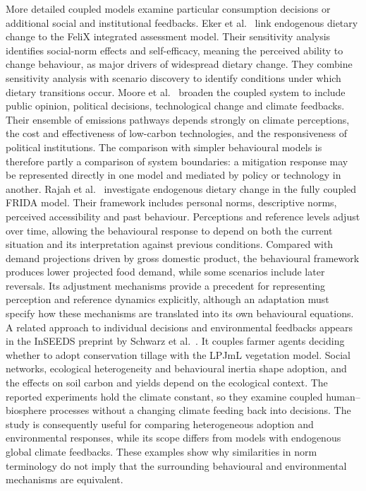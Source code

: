 More detailed coupled models examine particular consumption decisions or additional social and
institutional feedbacks. Eker et al.~\cite{eker2019diets} link endogenous dietary change to the FeliX
integrated assessment model. Their sensitivity analysis identifies social-norm effects and self-efficacy,
meaning the perceived ability to change behaviour, as major drivers of widespread dietary change. They
combine sensitivity analysis with scenario discovery to identify conditions under which dietary
transitions occur. Moore et al.~\cite{moore2022pathways} broaden the coupled system to include public
opinion, political decisions, technological change and climate feedbacks. Their ensemble of emissions
pathways depends strongly on climate perceptions, the cost and effectiveness of low-carbon technologies,
and the responsiveness of political institutions. The comparison with simpler behavioural models is
therefore partly a comparison of system boundaries: a mitigation response may be represented directly in
one model and mediated by policy or technology in another. Rajah et al.~\cite{rajah2025frida} investigate
endogenous dietary change in the fully coupled FRIDA model. Their framework includes personal norms,
descriptive norms, perceived accessibility and past behaviour. Perceptions and reference levels adjust
over time, allowing the behavioural response to depend on both the current situation and its
interpretation against previous conditions. Compared with demand projections driven by gross domestic
product, the behavioural framework produces lower projected food demand, while some scenarios include
later reversals. Its adjustment mechanisms provide a precedent for representing perception and reference
dynamics explicitly, although an adaptation must specify how these mechanisms are translated into its own
behavioural equations. A related approach to individual decisions and environmental feedbacks appears in
the InSEEDS preprint by Schwarz et al.~\cite{schwarz2025inseeds}. It couples farmer agents deciding
whether to adopt conservation tillage with the LPJmL vegetation model. Social networks, ecological
heterogeneity and behavioural inertia shape adoption, and the effects on soil carbon and yields depend on
the ecological context. The reported experiments hold the climate constant, so they examine coupled
human--biosphere processes without a changing climate feeding back into decisions. The study is
consequently useful for comparing heterogeneous adoption and environmental responses, while its scope
differs from models with endogenous global climate feedbacks. These examples show why similarities in
norm terminology do not imply that the surrounding behavioural and environmental mechanisms are
equivalent.


